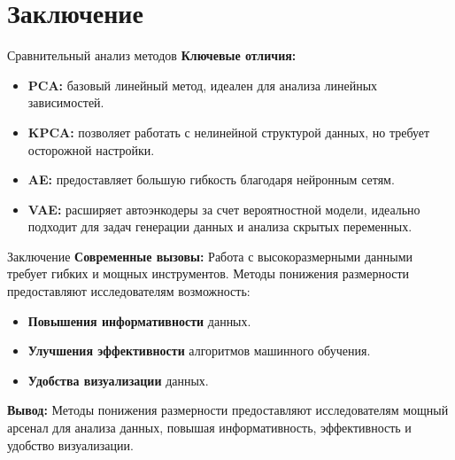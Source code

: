 \section{Заключение}

\begin{frame}{Сравнительный анализ методов}
    \textbf{Ключевые отличия:}
    \begin{itemize}
        \item \textbf{PCA:} базовый линейный метод, идеален для анализа линейных зависимостей.
        \item \textbf{KPCA:} позволяет работать с нелинейной структурой данных, но требует осторожной настройки.
        \item \textbf{AE:} предоставляет большую гибкость благодаря нейронным сетям.
        \item \textbf{VAE:} расширяет автоэнкодеры за счет вероятностной модели, идеально подходит для задач генерации данных и анализа скрытых переменных.
    \end{itemize}
\end{frame}

\begin{frame}{Заключение}
    \textbf{Современные вызовы:} Работа с высокоразмерными данными требует гибких и мощных инструментов. Методы понижения размерности предоставляют исследователям возможность:
    \begin{itemize}
        \item \textbf{Повышения информативности} данных.
        \item \textbf{Улучшения эффективности} алгоритмов машинного обучения.
        \item \textbf{Удобства визуализации} данных.
    \end{itemize}

    \textbf{Вывод:} Методы понижения размерности предоставляют исследователям мощный арсенал для анализа данных, повышая информативность, эффективность и удобство визуализации.
\end{frame}
